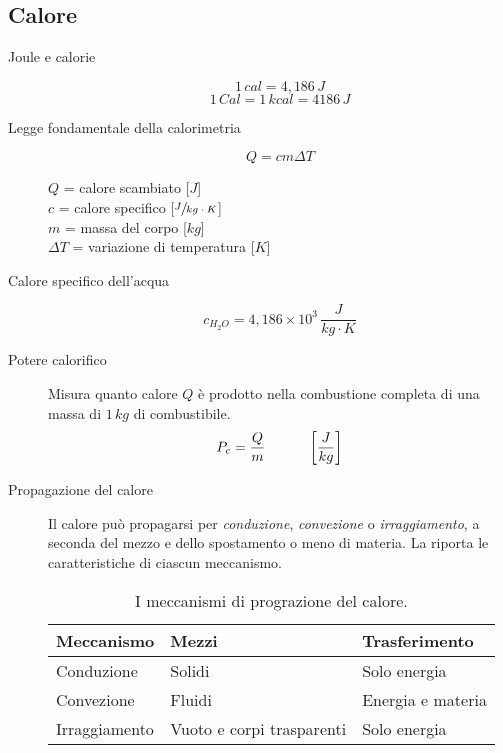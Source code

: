 \documentclass[a4paper,11pt,italian]{article}
\begin{document}
\subsection{Calore}

\begin{description}
  \item[Joule e calorie] 
  \[ 1 \, cal = 4,186 \, J \] \[ 1 \, Cal = 1 \, kcal = 4186 \, J \]
  
  \item[Legge fondamentale della calorimetria]
  \[ Q = cm \Delta T \]
  \begin{multicols}{2}
  $ Q $ = calore scambiato [$ J $]\\
  $ c $ = calore specifico [$ \sfrac{J}{kg\cdot K} $]\\
  $ m $ = massa del corpo [$ kg $]\\
  $ \Delta T $ = variazione di temperatura [$ K $]
  \end{multicols}
  
  \item[Calore specifico dell'acqua] 
  \[ c_{H_2O} = 4,186 \times 10^3 \, \frac{J}{kg \cdot K}\]
  
  \item[Potere calorifico] 
  Misura quanto calore $ Q $ è prodotto nella combustione completa di una massa di $ 1 \, kg $ di combustibile.
  \[ P_c = \frac{Q}{m} \hspace*{3em} \left[ \frac{J}{kg} \right] \]
  
  \item[Propagazione del calore] 
  Il calore può propagarsi per \emph{conduzione}, \emph{convezione} o \emph{irraggiamento}, a seconda del mezzo e dello spostamento o meno di materia. La  riporta le caratteristiche di ciascun meccanismo.

\begin{table}[htb]\centering\footnotesize
\begin{tabular}{lll}\toprule
\textbf{Meccanismo} & \textbf{Mezzi}            & \textbf{Trasferimento}\\\midrule
Conduzione          & Solidi                    & Solo energia\\\addlinespace[1em]
Convezione          & Fluidi                    & Energia e materia\\\addlinespace[1em]
Irraggiamento       & Vuoto e corpi trasparenti & Solo energia\\\bottomrule
\end{tabular}
\caption{I meccanismi di prograzione del calore.}
\label{tab:conduzione}
\end{table}



\end{description}
\end{document}
